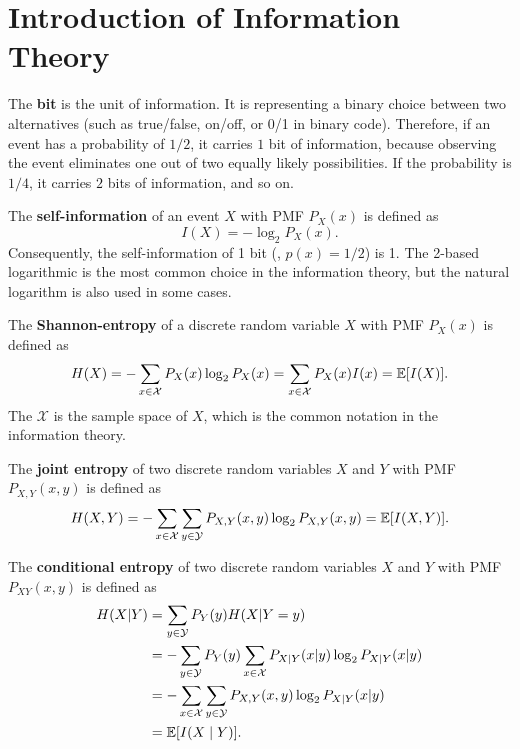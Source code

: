 \chapter{Introduction of Information Theory}

\begin{definition}
    [bit]
    The \textbf{bit} is the unit of information. It is representing a binary choice between two alternatives (such as true/false, on/off, or 0/1 in binary code). Therefore, if an event has a probability of $1/2$, it carries $1$ bit of information, because observing the event eliminates one out of two equally likely possibilities. If the probability is $1/4$, it carries $2$ bits of information, and so on.
\end{definition}

\begin{definition}
    The \textbf{self-information} of an event $X$ with \textnormal{PMF} $P_X(x)$ is defined as
    \[I(X)=-\log_2P_X(x).\]
    Consequently, the self-information of 1 bit (\ie, $p(x)=1/2$) is 1. The 2-based logarithmic is the most common choice in the information theory, but the natural logarithm is also used in some cases.
\end{definition}

\begin{definition}
    The \textbf{Shannon-entropy} of a discrete random variable $X$ with \textnormal{PMF} $P_X(x)$ is defined as
    \[H(X)=-\sum_{x\in\mathcal{X}}P_X(x)\log_2P_X(x)=\sum_{x\in\mathcal{X}}P_X(x)I(x)=\E{I(X)}.\]
    The $\mathcal{X}$ is the sample space of $X$, which is the common notation in the information theory.
\end{definition}

\begin{definition}
    The \textbf{joint entropy} of two discrete random variables $X$ and $Y$ with \textnormal{PMF} $P_{X,Y}(x,y)$ is defined as
    \[H(X,Y)=-\sum_{x\in\mathcal{X}}\sum_{y\in\mathcal{Y}}P_{X,Y}(x,y)\log_2P_{X,Y}(x,y)=\E{I(X,Y)}.\]
\end{definition}

\begin{definition}
    The \textbf{conditional entropy} of two discrete random variables $X$ and $Y$ with \textnormal{PMF} $P_{XY}(x,y)$ is defined as
    \begin{align*}
        H(X|Y)
        &= \sum_{y\in \mathcal{Y}}P_Y(y)H(X|Y=y)\\
        &= -\sum_{y\in\mathcal{Y}}P_Y(y)\sum_{x\in\mathcal{X}}P_{X|Y}(x|y)\log_2P_{X|Y}(x|y)\\
        &= -\sum_{x\in\mathcal{X}}\sum_{y\in\mathcal{Y}}P_{X,Y}(x,y)\log_2P_{X|Y}(x|y) \\
        &= \E{I(X\mid Y)}.
    \end{align*}
\end{definition}

